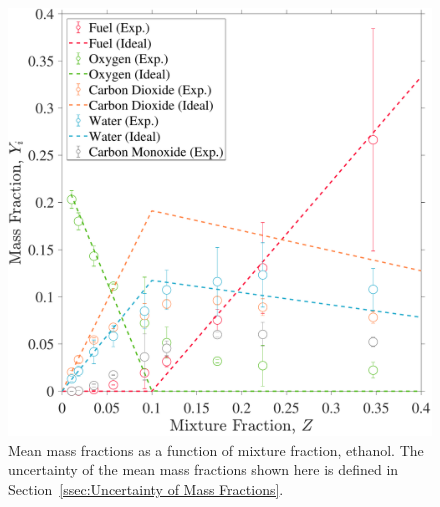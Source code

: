 \documentclass[12pt]{article}
\begin{document}
\begin{figure}[!]
	\centering
\includegraphics[width=\textwidth,keepaspectratio]{Adjusted_FuelEthanol_Mixture_Fraction_Intermediate_Plot.pdf}
	\caption[Mean mass fractions as a function of mixture fraction, ethanol]{Mean mass fractions as a function of mixture fraction, ethanol. The uncertainty of the mean mass fractions shown here is defined in Section~\ref{ssec:Uncertainty of Mass Fractions}.}
	\label{fig:Ethanol_Mix_Frac}
\end{figure}
\end{document}
